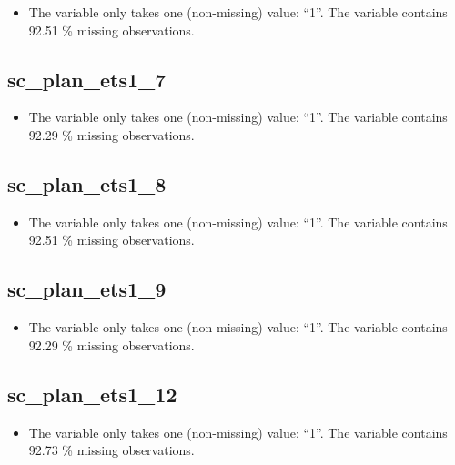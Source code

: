 \documentclass[
  letterpaper,
  DIV=11,
  numbers=noendperiod]{scrartcl}
\providecommand{\tightlist}{%
  \setlength{\itemsep}{0pt}\setlength{\parskip}{0pt}}
\begin{document}
\begin{itemize}
\tightlist
\item
  The variable only takes one (non-missing) value: ``1''. The variable
  contains 92.51 \% missing observations.
\end{itemize}

\fullline

\subsection{sc\_plan\_ets1\_7}\label{sc_plan_ets1_7}

\begin{itemize}
\tightlist
\item
  The variable only takes one (non-missing) value: ``1''. The variable
  contains 92.29 \% missing observations.
\end{itemize}

\fullline

\subsection{sc\_plan\_ets1\_8}\label{sc_plan_ets1_8}

\begin{itemize}
\tightlist
\item
  The variable only takes one (non-missing) value: ``1''. The variable
  contains 92.51 \% missing observations.
\end{itemize}

\fullline

\subsection{sc\_plan\_ets1\_9}\label{sc_plan_ets1_9}

\begin{itemize}
\tightlist
\item
  The variable only takes one (non-missing) value: ``1''. The variable
  contains 92.29 \% missing observations.
\end{itemize}

\fullline

\subsection{sc\_plan\_ets1\_12}\label{sc_plan_ets1_12}

\begin{itemize}
\tightlist
\item
  The variable only takes one (non-missing) value: ``1''. The variable
  contains 92.73 \% missing observations.
\end{itemize}
\end{document}
